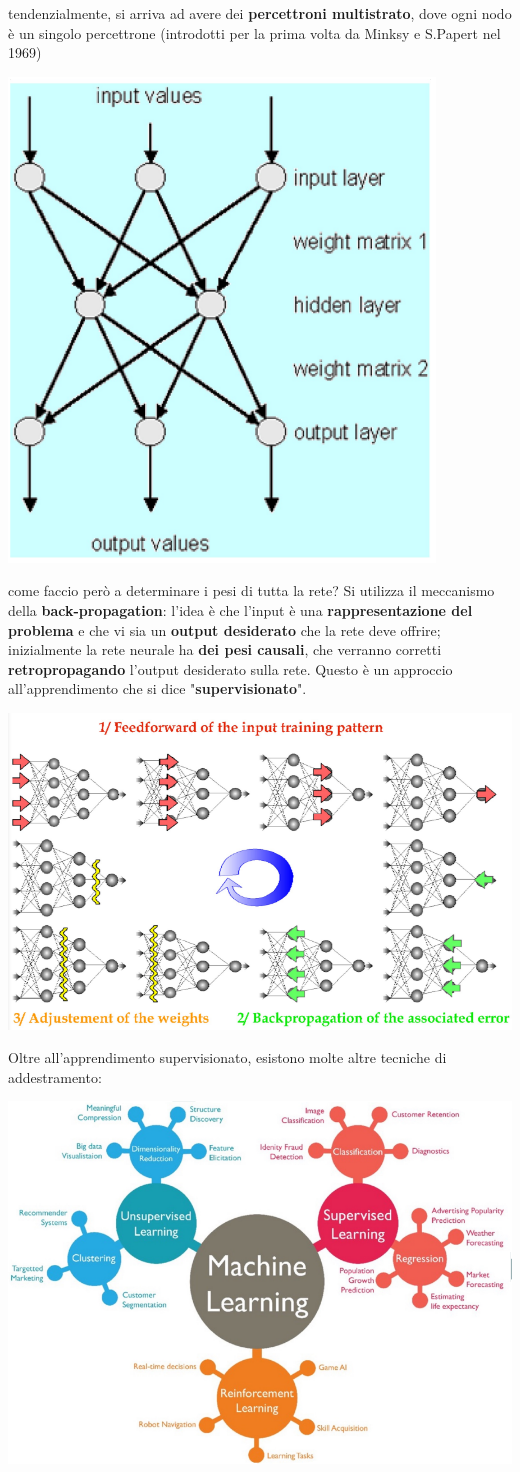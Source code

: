 \documentclass[12pt]{article}
\begin{document}
tendenzialmente, si arriva ad avere dei \textbf{percettroni multistrato}, dove ogni nodo è un singolo percettrone (introdotti per la prima volta da Minksy e S.Papert nel 1969)
\begin{center}
    \includegraphics[width = 0.40\linewidth]{Images/6.PNG}
\end{center}
come faccio però a determinare i pesi di tutta la rete? Si utilizza il meccanismo della \textbf{back-propagation}: l'idea è che l'input è una \textbf{rappresentazione del problema} e che vi sia un \textbf{output desiderato} che la rete deve offrire;
inizialmente la rete neurale ha \textbf{dei pesi causali}, che verranno corretti \textbf{retropropagando} l'output desiderato sulla rete.
Questo è un approccio all'apprendimento che si dice "\textbf{supervisionato}".
\begin{center}
    \includegraphics[width = 0.75\linewidth]{Images/7.PNG}
\end{center}
Oltre all'apprendimento supervisionato, esistono molte altre tecniche di addestramento:
\begin{center}
    \includegraphics[width = 0.95\linewidth]{Images/8.PNG}
\end{center}
\newpage
\end{document}
